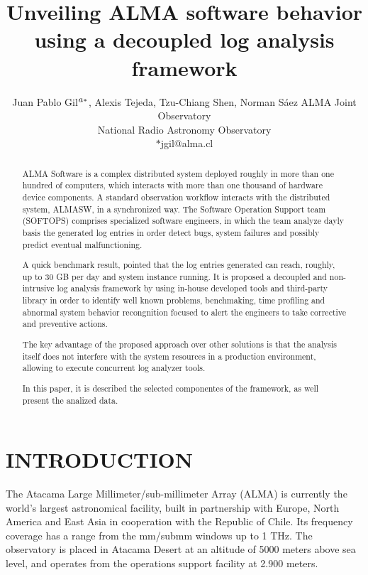 \documentclass[]{spie}  %
\title{Unveiling ALMA software behavior using a decoupled log analysis framework}
\author{Juan Pablo Gil$\supit{a}^{*}$, 
Alexis Tejeda\supit{b}, 
Tzu-Chiang Shen\supit{a}, 
Norman S\'aez\supit{a}
\skiplinehalf
\supit{a}ALMA Joint Observatory\\
\supit{b}National Radio Astronomy Observatory\\ $*$jgil@alma.cl
}
\begin{document}
 
  \maketitle 

\begin{abstract}
ALMA Software is a complex distributed system deployed roughly in more than one
hundred of computers, which interacts with more than one thousand of hardware
device components. A standard observation workflow interacts with the
distributed system, ALMASW, in a synchronized way. The Software Operation
Support team (SOFTOPS) comprises specialized software engineers, in which the 
team analyze dayly basis the generated log entries in order detect bugs, system 
failures and possibly predict eventual malfunctioning. 

A quick benchmark result, pointed that the log entries generated can reach, 
roughly, up to 30 GB per day and system instance running. It is proposed a 
decoupled and non-intrusive log analysis framework by using in-house developed 
tools and third-party library in order to identify well known problems, 
benchmaking, time profiling and
abnormal system behavior recongnition focused to alert the engineers to take 
corrective and preventive actions.

The key advantage of the proposed approach over other solutions is that the 
analysis itself does not interfere with the system resources in a production 
environment, allowing to execute concurrent log analyzer tools. 

In this paper, it is described the selected componentes of the framework, as 
well present the analized data.
\end{abstract}



\renewcommand{\thefootnote}{\arabic{footnote}}

\section{INTRODUCTION}\label{sec:intro}  %
The Atacama Large Millimeter/sub-millimeter Array (ALMA) is currently the
world's largest astronomical facility, built in partnership with Europe,
North America and East Asia in cooperation with the Republic of Chile. Its
frequency coverage has a range from the mm/submm windows up to 1 THz. The
observatory is placed in Atacama Desert at an altitude of 5000 meters above
sea level, and operates from the operations support facility at
2.900 meters.
\end{document}
